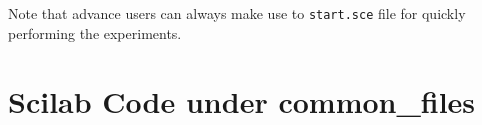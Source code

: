 Note that advance users can always make use to {\tt start.sce} file for quickly performing the experiments.

\section{Scilab Code under common\_files}\label{commonfiles}
\begin{code}

\end{code}

\begin{code}

\end{code}

\begin{code}

\end{code}




